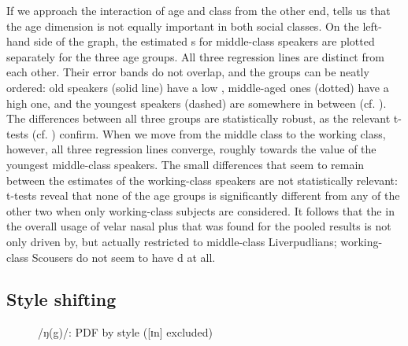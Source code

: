 If we approach the interaction of age and class from the other end,  tells us that the age dimension is not equally important in both social classes.
On the left-hand side of the graph, the estimated s for middle-class speakers are plotted separately for the three age groups.
All three regression lines are distinct from each other.
Their error bands do not overlap, and the groups can be neatly ordered: old speakers (solid line) have a low , middle-aged ones (dotted) have a high one, and the youngest speakers (dashed) are somewhere in between (cf. ).
The differences between all three groups are statistically robust, as the relevant t-tests (cf. ) confirm.
When we move from the middle class to the working class, however, all three regression lines converge, roughly towards the value of the youngest middle-class speakers.
The small differences that seem to remain between the estimates of the working-class speakers are not statistically relevant: t-tests reveal that none of the age groups is significantly different from any of the other two when only working-class subjects are considered.
It follows that the  in the overall usage of velar nasal plus that was found for the pooled results is not only driven by, but actually restricted to middle-class Liverpudlians; working-class Scousers do not seem to have d at all.

\subsection{Style shifting}
\label{sec.prod.res.con.ng.shifting}

\begin{figure}[b]
	
		\resizebox{0.6\linewidth}{!}{} 
	\caption{/ŋ(g)/: PDF by style ([ɪn] excluded)}
	\label{fig.line.ng.tot}
\end{figure}

